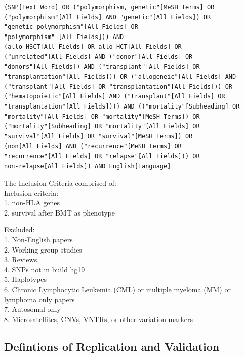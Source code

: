 \documentclass[]{DissertateOSU}
\begin{document}
\singlespaced

\begin{verbatim}
(SNP[Text Word] OR ("polymorphism, genetic"[MeSH Terms] OR
("polymorphism"[All Fields] AND "genetic"[All Fields]) OR
"genetic polymorphism"[All Fields] OR
"polymorphism" [All Fields])) AND
(allo-HSCT[All Fields] OR allo-HCT[All Fields] OR
("unrelated"[All Fields] AND ("donor"[All Fields] OR 
"donors"[All Fields]) AND ("transplant"[All Fields] OR
"transplantation"[All Fields])) OR ("allogeneic"[All Fields] AND
("transplant"[All Fields] OR "transplantation"[All Fields])) OR
("hematopoietic"[All Fields] AND ("transplant"[All Fields] OR
"transplantation"[All Fields]))) AND (("mortality"[Subheading] OR
"mortality"[All Fields] OR "mortality"[MeSH Terms]) OR 
("mortality"[Subheading] OR "mortality"[All Fields] OR
"survival"[All Fields] OR "survival"[MeSH Terms]) OR
(non[All Fields] AND ("recurrence"[MeSH Terms] OR
"recurrence"[All Fields] OR "relapse"[All Fields])) OR
non-relapse[All Fields]) AND English[Language]
\end{verbatim}

\doublespaced

\noindent The Inclusion Criteria comprised of:\\
\noindent Inclusion criteria:\\
1. non-HLA genes\\
2. survival after BMT as phenotype

\noindent Excluded:\\
1. Non-English papers\\
2. Working group studies\\
3. Reviews\\
4. SNPs not in build hg19\\
5. Haplotypes\\
6. Chronic Lymphocytic Leukemia (CML) or multiple myeloma (MM) or
lymphoma only papers\\
7. Autosomal only\\
8. Microsatellites, CNVs, VNTRs, or other variation markers

\subsection{Defintions of Replication and
Validation}\label{defintions-of-replication-and-validation}
\end{document}
